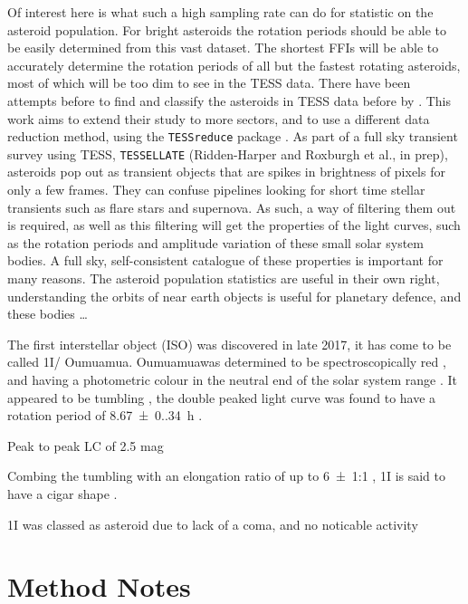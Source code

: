 \documentclass[12pt]{article}
\DeclareRobustCommand{\okina}{%
  \raisebox{\dimexpr\fontcharht\font`A-\height}{%
    \scalebox{0.8}{`}%
  }%
}
\newcommand{\omuamua}{\okina Oumuamua}
\begin{document}
Of interest here is what such a high sampling rate can do for statistic on the asteroid population. 
For bright asteroids the rotation periods should be able to be easily determined from this vast dataset. 
The shortest FFIs will be able to accurately determine the rotation periods of all but the fastest rotating asteroids, most of which will be too dim to see in the TESS data. 
There have been attempts before to find and classify the asteroids in TESS data before by \citet{Pal2018, Pal2020}. This work aims to extend their study to more sectors, and to use a different data reduction method, using the \texttt{TESSreduce} package \citep{Ridden-Harper2021}. 
As part of a full sky transient survey using TESS, \texttt{TESSELLATE} (Ridden-Harper and Roxburgh et al., in prep), asteroids pop out as transient objects that are spikes in brightness of pixels for only a few frames. 
They can confuse pipelines looking for short time stellar transients such as flare stars and supernova. 
As such, a way of filtering them out is required, as well as this filtering will get the properties of the light curves, such as the rotation periods and amplitude variation of these small solar system bodies.
A full sky, self-consistent catalogue of these properties is important for many reasons. 
The asteroid population statistics are useful in their own right, understanding the orbits of near earth objects is useful for planetary defence, and these bodies \dots      


The first interstellar object (ISO) was discovered in late 2017, it has come to be called 1I/\omuamua \citep[see][for a review]{Bannister2019}.
\omuamua was determined to be spectroscopically red \citep{Fitzsimmons2017, Meech2017}, and having a photometric colour in the neutral end of the solar system range \citep{Bannister2017}. 
It appeared to be tumbling \citep[e.g.][]{Drahus2018,Fraser2018}, the double peaked light curve was found to have a rotation period of \qty{8.67(0.34)}{\hour} \citep{Belton2018}.

Peak to peak LC of 2.5 mag \citep{Meech2017} %

Combing the tumbling with an elongation ratio of up to \qty{6(1)}{}:1 \citep{McNeill2018}, 1I is said to have a cigar shape \citep{Belton2018}.  


1I was classed as asteroid due to lack of a coma, and no noticable activity %


\section{Method Notes}
\end{document}
